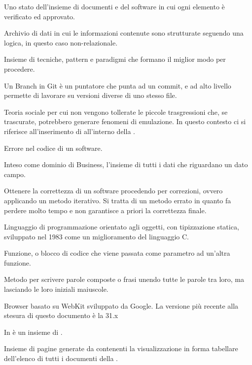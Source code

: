 
Uno stato dell'insieme di documenti e del software in cui ogni elemento è verificato ed approvato.

Archivio di dati in cui le informazioni contenute sono strutturate seguendo una logica, in questo caso non-relazionale.

Insieme di tecniche, pattern e paradigmi che formano il miglior modo per procedere.

Un Branch in Git è un puntatore che punta ad un commit, e ad alto livello permette di lavorare su versioni diverse di uno stesso file.

Teoria sociale per cui non vengono tollerate le piccole trasgressioni che, se trascurate, potrebbero generare fenomeni di emulazione. In questo contesto ci si riferisce all'inserimento di  all'interno della . 

Errore nel codice di un software.

Inteso come dominio di Business, l'insieme di tutti i dati che riguardano un dato campo.

Ottenere la correttezza di un software procedendo per correzioni, ovvero applicando un metodo iterativo. Si tratta di un metodo errato in quanto fa perdere molto tempo e non garantisce a priori la correttezza finale.


Linguaggio di programmazione orientato agli oggetti, con tipizzazione statica, sviluppato nel 1983 come un miglioramento del linguaggio C.

Funzione, o blocco di codice che viene passata come parametro ad un'altra funzione.

Metodo per scrivere parole composte o frasi unendo tutte le parole tra loro, ma lasciando le loro iniziali maiuscole.

Browser basato su WebKit sviluppato da Google. La versione più recente alla stesura di questo documento è la 31.x

In  è un insieme di .

Insieme di pagine generate da \ProjectName{} contenenti la visualizzazione in forma tabellare dell'elenco di tutti i documenti della  .

